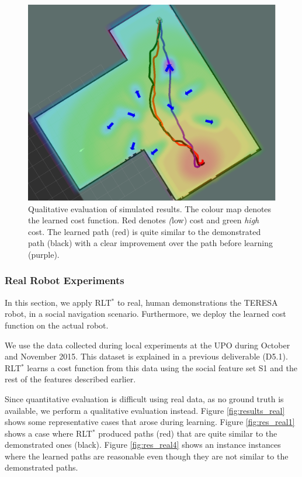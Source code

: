 \documentclass[a4paper,11pt]{report}
\begin{document}
	\begin{figure}[tbh]
	\centering
    \includegraphics[scale=0.15]{figures/kino_paths.png}
    \caption[Qualitative comparison of simulated results]{Qualitative evaluation of simulated results. The colour map denotes the learned cost function. Red denotes \emph(low) cost and green \emph{high} cost. The learned path (red) is quite similar to the demonstrated path (black) with a clear improvement over the path before learning (purple).}
    \vspace{-2mm}
  \label{fig:results_qual}
  \end{figure}

	\subsubsection{Real Robot Experiments}
	In this section, we apply RLT$^*$ to real, human demonstrations the TERESA robot, in a social navigation scenario. Furthermore, we deploy the learned cost function on the actual robot.

We use the data collected during local experiments at the UPO during October and November 2015. This dataset is explained in a previous deliverable (D5.1). RLT$^*$ learns a cost function from this data using the social feature set S1 and the rest of the features described earlier.

Since quantitative evaluation is difficult using real data, as no ground truth is available, we perform a qualitative evaluation instead. Figure \ref{fig:results_real} shows some representative cases that arose during learning. Figure \ref{fig:res_real1} shows a case where RLT$^*$ produced paths (red) that are quite similar to the demonstrated ones (black). Figure \ref{fig:res_real4} shows an instance instances where  the learned paths are reasonable even though they are not similar to the demonstrated paths.
\end{document}
